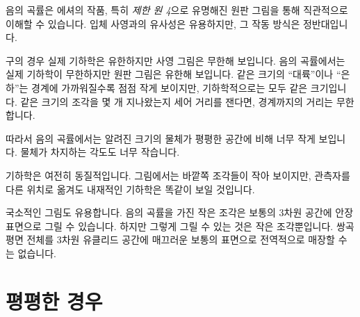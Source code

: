 음의 곡률은 에셔의 작품, 특히 \emph{제한 원 4}으로 유명해진 원판 그림을 통해 직관적으로 이해할 수 있습니다. 입체 사영과의 유사성은 유용하지만, 그 작동 방식은 정반대입니다.

구의 경우 실제 기하학은 유한하지만 사영 그림은 무한해 보입니다. 음의 곡률에서는 실제 기하학이 무한하지만 원판 그림은 유한해 보입니다. 같은 크기의 ``대륙''이나 ``은하''는 경계에 가까워질수록 점점 작게 보이지만, 기하학적으로는 모두 같은 크기입니다. 같은 크기의 조각을 몇 개 지나왔는지 세어 거리를 잰다면, 경계까지의 거리는 무한합니다.

따라서 음의 곡률에서는 알려진 크기의 물체가 평평한 공간에 비해 너무 작게 보입니다. 물체가 차지하는 각도도 너무 작습니다.

기하학은 여전히 동질적입니다. 그림에서는 바깥쪽 조각들이 작아 보이지만, 관측자를 다른 위치로 옮겨도 내재적인 기하학은 똑같이 보일 것입니다.

\begin{classroomqa}
\end{classroomqa}

\begin{classroomqa}
\end{classroomqa}

\begin{classroomqa}
\end{classroomqa}

국소적인 그림도 유용합니다. 음의 곡률을 가진 작은 조각은 보통의 3차원 공간에 안장 표면으로 그릴 수 있습니다. 하지만 그렇게 그릴 수 있는 것은 작은 조각뿐입니다. 쌍곡평면 전체를 3차원 유클리드 공간에 매끄러운 보통의 표면으로 전역적으로 매장할 수는 없습니다.

\section{평평한 경우}

